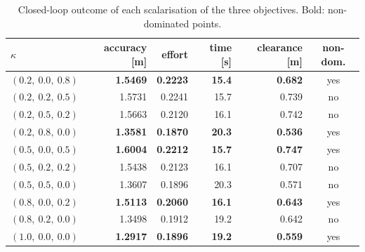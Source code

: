 \begin{table}[htbp]
  \centering
  \small
  \caption{Closed-loop outcome of each scalarisation of the three objectives. Bold: non-dominated points.}
  \label{res:tab:pareto}
  \begin{tabular}{lrrrrc}
    \toprule
    $\kappa$ & accuracy [m] & effort & time [s] & clearance [m] & non-dom. \\
    \midrule
    $(0.2,\ 0.0,\ 0.8)$ & \textbf{1.5469} & \textbf{0.2223} & \textbf{15.4} & \textbf{0.682} & yes \\
    $(0.2,\ 0.2,\ 0.5)$ & 1.5731 & 0.2241 & 15.7 & 0.739 & no \\
    $(0.2,\ 0.5,\ 0.2)$ & 1.5663 & 0.2120 & 16.1 & 0.742 & no \\
    $(0.2,\ 0.8,\ 0.0)$ & \textbf{1.3581} & \textbf{0.1870} & \textbf{20.3} & \textbf{0.536} & yes \\
    $(0.5,\ 0.0,\ 0.5)$ & \textbf{1.6004} & \textbf{0.2212} & \textbf{15.7} & \textbf{0.747} & yes \\
    $(0.5,\ 0.2,\ 0.2)$ & 1.5438 & 0.2123 & 16.1 & 0.707 & no \\
    $(0.5,\ 0.5,\ 0.0)$ & 1.3607 & 0.1896 & 20.3 & 0.571 & no \\
    $(0.8,\ 0.0,\ 0.2)$ & \textbf{1.5113} & \textbf{0.2060} & \textbf{16.1} & \textbf{0.643} & yes \\
    $(0.8,\ 0.2,\ 0.0)$ & 1.3498 & 0.1912 & 19.2 & 0.642 & no \\
    $(1.0,\ 0.0,\ 0.0)$ & \textbf{1.2917} & \textbf{0.1896} & \textbf{19.2} & \textbf{0.559} & yes \\
    \bottomrule
  \end{tabular}
\end{table}

